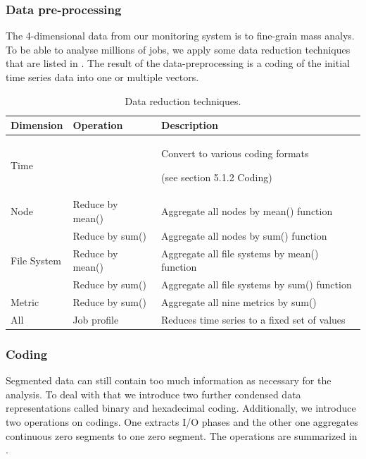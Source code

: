 \documentclass[]{llncs}
\begin{document}
\subsubsection{Data pre-processing}
The 4-dimensional data from our monitoring system is to fine-grain mass analys. To be able to analyse millions of jobs, we apply some data reduction techniques that are listed in .
The result of the data-preprocessing is a coding of the initial time series data into one or multiple vectors.

\begin{table}
	\centering
	\begin{tabularx}{\textwidth}{llX}
		\hline
		Dimension       & Operation                                    &  Description                                                       \\ 
		\hline
		Time            &                                              &  Convert to various coding formats \par (see section 5.1.2 Coding) \\ 
		\hline
		Node            & Reduce by mean()                             &  Aggregate all nodes by mean() function                            \\ 
		\hline
		                & Reduce by sum()                              &  Aggregate all nodes by sum() function                             \\ 
		\hline
		File System     & Reduce by mean()                             &  Aggregate all file systems by mean() function                     \\ 
		\hline
		                & 
		Reduce by sum() & Aggregate all file systems by sum() function \\ 
		\hline
		Metric          & Reduce by sum()                              &  Aggregate all nine metrics by sum()                               \\ 
		\hline
		All             & Job profile                                  &  Reduces time series to a fixed set of values                      \\ 
		\hline
	\end{tabularx}
	\caption{Data reduction techniques.}
	\label{tab:reduction_techniques}
\end{table}




\subsubsection{Coding}
Segmented data can still contain too much information as necessary for the analysis.
To deal with that we introduce two further condensed data representations called binary and hexadecimal coding.
Additionally, we introduce two operations on codings.
One extracts I/O phases and the other one aggregates continuous zero segments to one zero segment.
The operations are summarized in .
\end{document}
